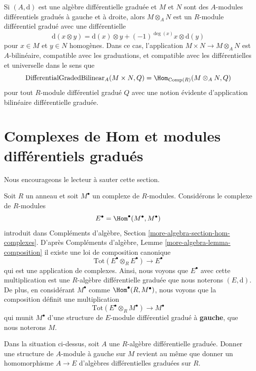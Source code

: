 \medskip\noindent
Si $(A, \text{d})$ est une algèbre différentielle graduée et $M$ et $N$ sont des
$A$-modules différentiels gradués à gauche et à droite, alors $M \otimes_A N$ est
un $R$-module différentiel gradué avec une différentielle
$$
\text{d}(x \otimes y) =
\text{d}(x) \otimes y + (-1)^{\deg(x)}x \otimes \text{d}(y)
$$
pour $x \in M$ et $y \in N$ homogènes. Dans ce cas, l'application $M \times N \to
M \otimes_A N$ est $A$-bilinéaire, compatible avec les graduations, et compatible
avec les différentielles et universelle dans le sens que
$$
\text{DifferentialGradedBilinear}_A(M \times N, Q) =
\Hom_{\text{Comp}(R)}(M \otimes_A N, Q)
$$
pour tout $R$-module différentiel gradué $Q$ avec une notion évidente d'application
bilinéaire différentielle graduée.






\section{Complexes de Hom et modules différentiels gradués}
\label{section-hom-complexes}

\noindent
Nous encourageons le lecteur à sauter cette section.

\medskip\noindent
Soit $R$ un anneau et soit $M^\bullet$ un complexe de $R$-modules. Considérons le
complexe de $R$-modules
$$
E^\bullet = \Hom^\bullet(M^\bullet, M^\bullet)
$$
introduit dans Compléments d'algèbre, Section
\ref{more-algebra-section-hom-complexes}. D'après Compléments d'algèbre, Lemme
\ref{more-algebra-lemma-composition} il existe une loi de composition canonique
$$
\text{Tot}(E^\bullet \otimes_R E^\bullet) \to E^\bullet
$$
qui est une application de complexes. Ainsi, nous voyons que $E^\bullet$ avec
cette multiplication est une $R$-algèbre différentielle graduée que nous noterons
$(E, \text{d})$. De plus, en considérant $M^\bullet$ comme $\Hom^\bullet(R,
M^\bullet)$, nous voyons que la composition définit une multiplication
$$
\text{Tot}(E^\bullet \otimes_R M^\bullet) \to M^\bullet
$$
qui munit $M^\bullet$ d'une structure de $E$-module différentiel gradué à {\bf
gauche}, que nous noterons $M$.

\begin{lemma}
\label{lemma-left-module-structure}
Dans la situation ci-dessus, soit $A$ une $R$-algèbre différentielle graduée.
Donner une structure de $A$-module à gauche sur $M$ revient au même que donner un
homomorphisme $A \to E$ d'algèbres différentielles graduées sur $R$.
\end{lemma}

